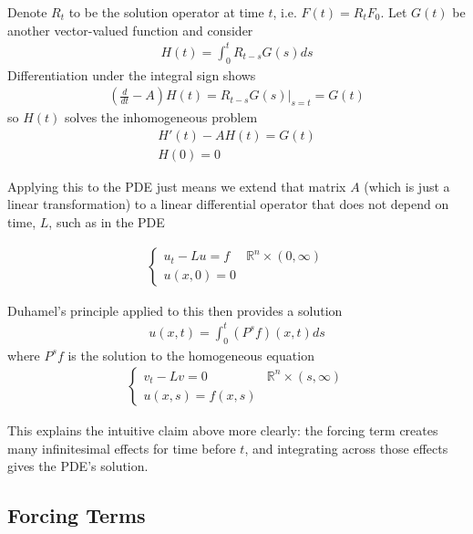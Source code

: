 \documentclass{article}
\newcommand{\R}{{\mathbb{R}}}
\begin{document}
	Denote $R_{t}$ to be the solution operator at time $t$, i.e. $F(t) = R_{t}F_0$. Let $G(t)$ be another vector-valued function and consider
	\begin{align*}
		H(t) = \int_{0}^{t} R_{t-s}G(s)ds
	\end{align*}
	Differentiation under the integral sign shows
	\begin{align*}
		(\frac{d}{dt} - A)H(t) = R_{t-s}G(s)|_{s=t} = G(t)
	\end{align*}
	so $H(t)$ solves the inhomogeneous problem
	\begin{align*}
		H'(t) - AH(t) = G(t) \\
		H(0) = 0
	\end{align*}
	
	Applying this to the PDE just means we extend that matrix $A$ (which is just a linear transformation) to a linear differential operator that does not depend on time, $L$, such as in the PDE
	
	\begin{align*}
		\begin{cases}
			u_{t} - Lu = f & \R^{n} \times (0,\infty) \\ 
			u(x,0) = 0 
		\end{cases}
	\end{align*}
	
	Duhamel's principle applied to this then provides a solution 
	\begin{align*}
		u(x,t) = \int_{0}^{t} (P^{s}f)(x,t)ds
	\end{align*}
	where $P^{s}f$ is the solution to the homogeneous equation 
	\begin{align*}
		\begin{cases}
			v_{t} - Lv = 0 & \R^{n} \times (s,\infty) \\ 
			u(x,s) = f(x,s) 
		\end{cases}
	\end{align*} 
	
	This explains the intuitive claim above more clearly: the forcing term creates many infinitesimal effects for time before $t$, and integrating across those effects gives the PDE's solution. 
	
	
	
	
	
	
	\vspace{0.25cm}
	
	\subsection{Forcing Terms}
	
\end{document}
